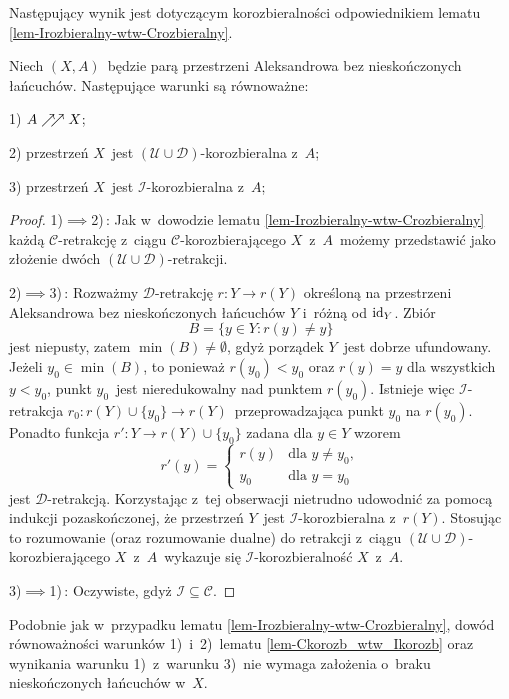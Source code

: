 Następujący wynik jest dotyczącym korozbieralności odpowiednikiem lematu \ref{lem-Irozbieralny-wtw-Crozbieralny}.
\begin{lem}\label{lem-Ckorozb_wtw_Ikorozb}
Niech $(X,A)$~będzie parą przestrzeni Aleksandrowa bez nieskończonych łańcuchów. Następujące warunki są równoważne:
\begin{compactitem}
\item[1)] $A\nearrow\!\!\nearrow X$;
\item[2)] przestrzeń $X$~jest $(\mathcal{U}\cup\mathcal{D})$-korozbieralna z~$A$;
\item[3)] przestrzeń $X$~jest $\mathcal{I}$-korozbieralna z~$A$;
\end{compactitem}
\end{lem}
\begin{proof}
1)$\implies$2)\,: Jak w~dowodzie lematu \ref{lem-Irozbieralny-wtw-Crozbieralny} każdą $\mathcal{C}$-retrakcję z~ciągu \mbox{$\mathcal{C}$-korozbierającego} $X$~z~$A$~możemy przedstawić jako złożenie dwóch \mbox{$(\mathcal{U}\cup\mathcal{D})$-retrakcji}.

2)$\implies$3)\,: Rozważmy $\mathcal{D}$-retrakcję $r\colon Y\to r(Y)$ określoną na przestrzeni Aleksandrowa bez nieskończonych łańcuchów $Y$ i~różną od $\operatorname{id}_{Y}$. Zbiór \[B=\{y\in Y:r(y)\not=y\}\] jest niepusty, zatem $\min(B)\not=\emptyset$, gdyż porządek $Y$~jest dobrze ufundowany. Jeżeli $y_0\in\min(B)$, to ponieważ $r(y_0)<y_0$ oraz $r(y)=y$ dla wszystkich $y<y_0$, punkt $y_0$~jest nieredukowalny nad punktem $r(y_0)$. Istnieje więc \mbox{$\mathcal{I}$-retrakcja} $r_0\colon r(Y)\cup\{y_0\}\to r(Y)$~przeprowadzająca punkt $y_0$ na $r(y_0)$. Ponadto funkcja $r'\colon Y\to r(Y)\cup\{y_0\}$ zadana dla $y\in Y$ wzorem \[r'(y)=\begin{cases}r(y) & \text{dla } y\not=y_0,\\y_0 & \text{dla } y=y_0\end{cases}\] jest $\mathcal{D}$-retrakcją. Korzystając z~tej obserwacji nietrudno udowodnić za pomocą indukcji pozaskończonej, że przestrzeń $Y$~jest \mbox{$\mathcal{I}$-korozbieralna} z~$r(Y)$. Stosując to rozumowanie (oraz rozumowanie dualne) do retrakcji z~ciągu \mbox{$(\mathcal{U}\cup\mathcal{D})$-korozbierającego} $X$~z~$A$~wykazuje się \mbox{$\mathcal{I}$-korozbieralność} $X$~z~$A$.

3)$\implies$1)\,: Oczywiste, gdyż $\mathcal{I}\subseteq \mathcal{C}$.
\end{proof}

Podobnie jak w~przypadku lematu \ref{lem-Irozbieralny-wtw-Crozbieralny}, dowód równoważności warunków 1)~i~2)~lematu \ref{lem-Ckorozb_wtw_Ikorozb} oraz wynikania warunku 1)~z~warunku 3)~nie wymaga założenia o~braku nieskończonych łańcuchów w~$X$.

